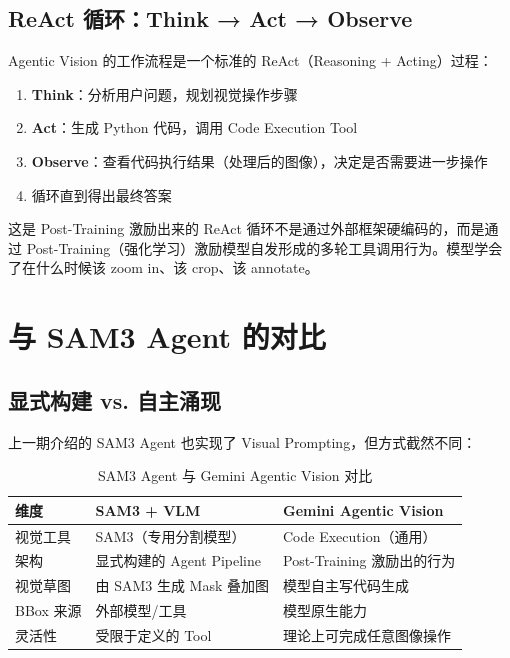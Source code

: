 \documentclass[a4paper]{article}
\begin{document}
\subsection{ReAct 循环：Think → Act → Observe}

Agentic Vision 的工作流程是一个标准的 ReAct（Reasoning + Acting）过程：

\begin{enumerate}
    \item \textbf{Think}：分析用户问题，规划视觉操作步骤
    \item \textbf{Act}：生成 Python 代码，调用 Code Execution Tool
    \item \textbf{Observe}：查看代码执行结果（处理后的图像），决定是否需要进一步操作
    \item 循环直到得出最终答案
\end{enumerate}

\begin{knowledgebox}{这是 Post-Training 激励出来的}
ReAct 循环不是通过外部框架硬编码的，而是通过 Post-Training（强化学习）激励模型自发形成的多轮工具调用行为。模型学会了在什么时候该 zoom in、该 crop、该 annotate。
\end{knowledgebox}


\section{与 SAM3 Agent 的对比}

\subsection{显式构建 vs. 自主涌现}

上一期介绍的 SAM3 Agent 也实现了 Visual Prompting，但方式截然不同：

\begin{table}[H]
\centering
\begin{tabular}{p{3cm}p{5cm}p{5cm}}
\toprule
\textbf{维度} & \textbf{SAM3 + VLM} & \textbf{Gemini Agentic Vision} \\
\midrule
视觉工具 & SAM3（专用分割模型） & Code Execution（通用） \\
架构 & 显式构建的 Agent Pipeline & Post-Training 激励出的行为 \\
视觉草图 & 由 SAM3 生成 Mask 叠加图 & 模型自主写代码生成 \\
BBox 来源 & 外部模型/工具 & 模型原生能力 \\
灵活性 & 受限于定义的 Tool & 理论上可完成任意图像操作 \\
\bottomrule
\end{tabular}
\caption{SAM3 Agent 与 Gemini Agentic Vision 对比}
\end{table}
\end{document}
